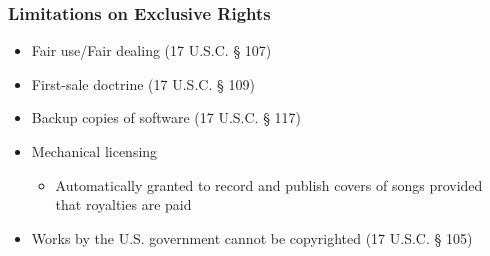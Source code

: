 \begin{frame}
  \frametitle{Limitations on Exclusive Rights}

  \begin{itemize}
    \item Fair use/Fair dealing (17 U.S.C. § 107)
    \item First-sale doctrine (17 U.S.C. § 109)
    \item Backup copies of software (17 U.S.C. § 117)
    \item Mechanical licensing
    \begin{itemize}
      \item Automatically granted to record and publish covers of songs provided
      that royalties are paid
    \end{itemize}
    \item Works by the U.S. government cannot be copyrighted (17 U.S.C. § 105)
  \end{itemize}
\end{frame}
